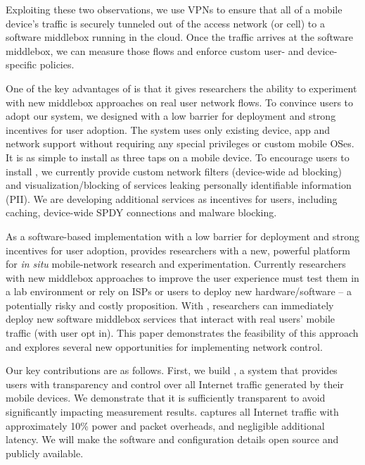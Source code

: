 Exploiting these two observations, we use VPNs to ensure that all of a mobile device's traffic is 
securely tunneled out of the access network (\wifi or cell) to a software middlebox running 
in the cloud. Once the traffic arrives at the software middlebox, we can measure those flows 
and enforce custom user- and device-specific policies. 

One of the key advantages of \meddle is that it gives researchers the ability to experiment 
with new middlebox approaches on real user network flows. To convince users to adopt our 
system, we designed \meddle with a low barrier for deployment and strong incentives for 
user adoption. The system uses only existing device, app and network support without requiring 
any special privileges or custom mobile OSes. It is as simple to install as three taps 
on a mobile device. To encourage users to install \meddle, we currently provide custom 
network filters (\eg device-wide ad blocking) and visualization/blocking of services leaking 
personally identifiable information (PII). We are developing additional services as incentives 
for users, including caching, device-wide SPDY connections and malware blocking.

As a software-based implementation with a low barrier for deployment and strong incentives for 
user adoption, \meddle provides researchers with a new, powerful platform for \emph{in situ} 
mobile-network research and experimentation. Currently researchers with new  
middlebox approaches to improve the user experience must test them in a lab environment or 
rely on ISPs or users to deploy new hardware/software -- a potentially risky and costly 
proposition. With \meddle, researchers 
can immediately deploy new software middlebox services that interact with 
real users' mobile traffic (with user opt in). %
This paper demonstrates the feasibility of this approach and explores several new opportunities 
for implementing network control.

Our key contributions are as follows. First, we build \meddle, a system that provides users with transparency 
and control %
over all Internet traffic generated by their 
mobile devices. We demonstrate that it is sufficiently transparent to avoid significantly impacting measurement results. 
\platname captures all Internet traffic with approximately 10\% power and packet overheads, and negligible additional latency. 
We will make the \platname software and configuration details open source and publicly available.

